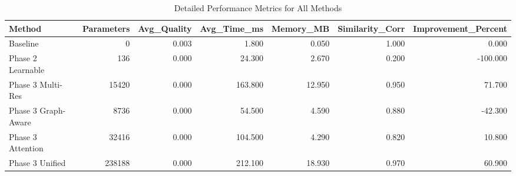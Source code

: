 \begin{table}
\caption{Detailed Performance Metrics for All Methods}
\label{tab:performance_metrics}
\begin{tabular}{lrrrrrr}
\toprule
Method & Parameters & Avg_Quality & Avg_Time_ms & Memory_MB & Similarity_Corr & Improvement_Percent \\
\midrule
Baseline & 0 & 0.003 & 1.800 & 0.050 & 1.000 & 0.000 \\
Phase 2 Learnable & 136 & 0.000 & 24.300 & 2.670 & 0.200 & -100.000 \\
Phase 3 Multi-Res & 15420 & 0.000 & 163.800 & 12.950 & 0.950 & 71.700 \\
Phase 3 Graph-Aware & 8736 & 0.000 & 54.500 & 4.590 & 0.880 & -42.300 \\
Phase 3 Attention & 32416 & 0.000 & 104.500 & 4.290 & 0.820 & 10.800 \\
Phase 3 Unified & 238188 & 0.000 & 212.100 & 18.930 & 0.970 & 60.900 \\
\bottomrule
\end{tabular}
\end{table}
